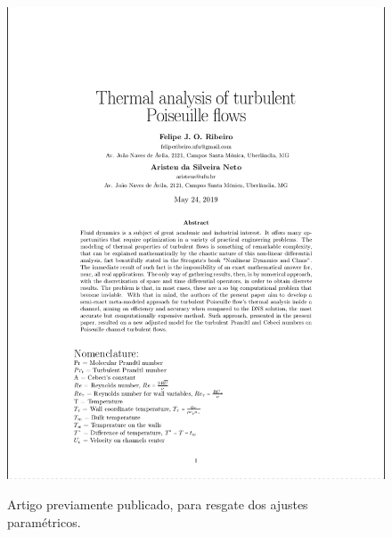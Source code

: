 \documentclass[xcolor=dvipsnames,10pt,aspectratio=169]{beamer}
\begin{document}
\begin{frame}
\begin{minipage}[h!]{0.325\textwidth}
\begin{figure}
				\includegraphics[page = 1,trim={1.0cm 1.0cm 1.0cm 0.0cm},clip=true, scale = 0.165]{Referencias/Projeto_cebeci}\\
				\caption{Artigo previamente publicado, para resgate dos ajustes paramétricos.}
			\end{figure}
			\vspace{6cm}
		\end{minipage}
	
	\end{frame}
\end{document}
